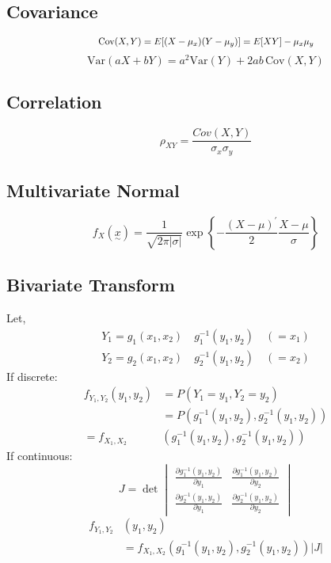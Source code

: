 	\subsection{Covariance}
		\[\scalebox{0.85}{ \(\text{Cov}(X,Y) = E[(X-\mu_x)(Y-\mu_y)] = E[XY] - \mu_x\mu_y\) }\]
		\[\text{Var}(aX+bY) = a^2\text{Var}(Y) + 2ab\,\text{Cov}(X,Y)\]
	
	\subsection{Correlation}
		\[\rho_{XY} = \frac{Cov(X,Y)}{\sigma_x\sigma_y}\]
		
	\subsection{Multivariate Normal}
		\[f_X(\underset{\sim}{x})= \frac{1}{\sqrt{2\pi|\sigma|}} \exp\left\{-\frac{(X-\mu)^\prime}{2} \frac{X-\mu}{\sigma} \right\}\]
	
	\subsection{Bivariate Transform}
		Let,
		\begin{equation*}
			\begin{split}
				Y_1 = g_1(x_1,x_2) \quad g_1^{-1}(y_1,y_2) \quad ( = x_1) \\
				Y_2 = g_2(x_1,x_2) \quad g_2^{-1}(y_1,y_2) \quad ( = x_2)
			\end{split}
		\end{equation*}
		If discrete:
		\begin{equation*}
			\begin{split}
				f_{Y_1,Y_2}(y_1,y_2) &= P(Y_1=y_1, Y_2=y_2) \\
				&= P(g_1^{-1}(y_1,y_2), g_2^{-1}(y_1,y_2)) \\
				= f_{X_1,X_2} &(g_1^{-1}(y_1,y_2), g_2^{-1}(y_1,y_2))
			\end{split}
		\end{equation*}
		If continuous:
		\begin{equation*}
			J = \det\begin{vmatrix}
				\frac{\partial g_1^{-1}(y_1,y_2)}{\partial y_1} & \frac{\partial g_1^{-1}(y_1,y_2)}{\partial y_2} \\
				\frac{\partial g_2^{-1}(y_1,y_2)}{\partial y_1} & \frac{\partial g_2^{-1}(y_1,y_2)}{\partial y_2}
			\end{vmatrix}
		\end{equation*}
		\begin{equation*}
			\begin{split}
				f_{Y_1,Y_2}&(y_1,y_2) \\&= f_{X_1,X_2}( g_1^{-1}(y_1,y_2),g_2^{-1}(y_1,y_2))|J|
			\end{split}
		\end{equation*}
	
